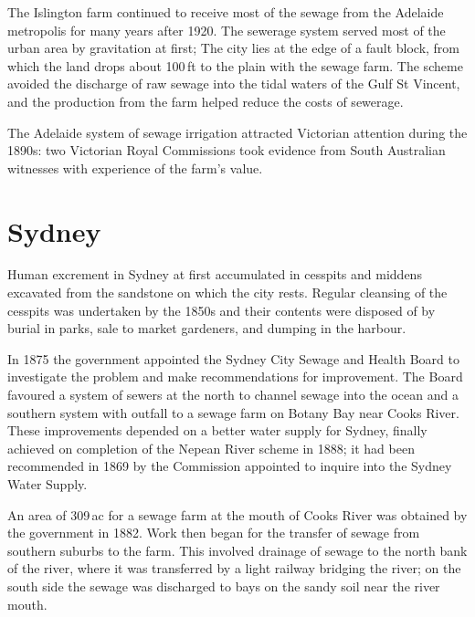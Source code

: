 The Islington farm continued to receive most of the sewage from the
Adelaide metropolis for many years after 1920.  The sewerage system
served most of the urban area by gravitation at first; The city lies
at the edge of a fault block, from which the land drops about 100\,ft
to the plain with the sewage farm.  The scheme avoided the discharge
of raw sewage into the tidal waters of the Gulf St Vincent, and the
production from the farm helped reduce the costs of sewerage.

The Adelaide system of sewage irrigation attracted Victorian attention
during the 1890s: two Victorian Royal Commissions took evidence from
South Australian witnesses with experience of the farm's
value.

\section*{Sydney}

Human excrement in Sydney at first accumulated in cesspits and middens
excavated from the sandstone on which the city rests.  Regular
cleansing of the cesspits was undertaken by the 1850s and their
contents were disposed of by burial in parks, sale to market
gardeners, and dumping in the harbour.

In 1875 the government appointed the Sydney City Sewage and Health
Board to investigate the problem and make recommendations for
improvement.  The Board favoured a system of sewers at the north to
channel sewage into the ocean and a southern system with outfall to a
sewage farm on Botany Bay near Cooks River.  These improvements depended on a better water supply for
Sydney, finally achieved on completion of the Nepean River scheme in
1888; it had been recommended in 1869 by the Commission appointed to
inquire into the Sydney Water Supply.

An area of 309\,ac for a sewage farm at the mouth of Cooks River was
obtained by the government in 1882.  Work then began for the transfer
of sewage from southern suburbs to the farm.  This involved drainage
of sewage to the north bank of the river, where it was transferred by
a light railway bridging the river; on the south side the sewage was
discharged to bays on the sandy soil near the river mouth.

